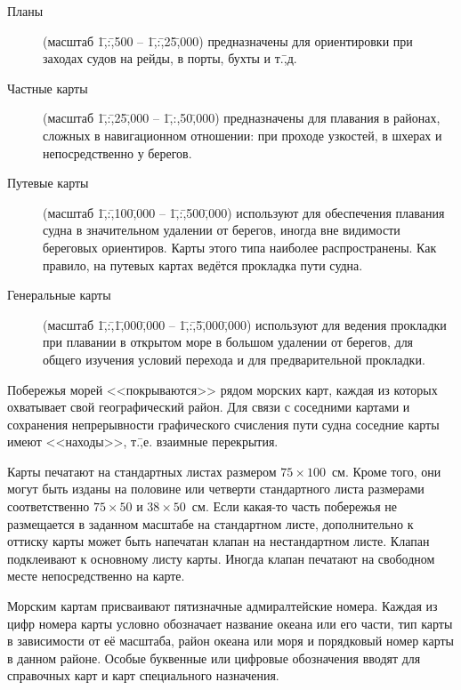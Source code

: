 \begin{description} 
\item [Планы] (масштаб 1\=,:\=,500 \--- 1\=,:\=,25\=,000)
  предназначены для ориентировки при заходах судов на рейды, в порты,
  бухты и т.\=,д.
\item [Частные карты] (масштаб 1\=,:\=,25\=,000
  \--- 1\=,:\-,50\=,000) предназначены для плавания в районах, сложных
  в навигационном отношении: при проходе узкостей, в шхерах и
  непосредственно у берегов.
\item [Путевые карты] (масштаб 1\=,:\=,100\=,000
  \--- 1\=,:\=,500\=,000) используют для обеспечения плавания судна в
  значительном удалении от берегов, иногда вне видимости береговых
  ориентиров. Карты этого типа наиболее распространены. Как правило,
  на путевых картах ведётся прокладка пути судна.
\item [Генеральные карты] (масштаб
  1\=,:\=,1\=,000\=,000 \--- 1\=,:\=,5\=,000\=,000) используют для
  ведения прокладки при плавании в открытом море в большом удалении от
  берегов, для общего изучения условий перехода и для предварительной
  прокладки.
\end{description}

Побережья морей <<покрываются>> рядом морских карт, каждая из которых
охватывает свой географический район. Для связи с соседними картами и
сохранения непрерывности графического счисления пути судна соседние
карты имеют <<находы>>, т.\=,е. взаимные перекрытия.

Карты печатают на стандартных листах размером $75 \times
100$~см. Кроме того, они могут быть изданы на половине или четверти
стандартного листа размерами соответственно $75 \times 50$ и
$38 \times 50$~см. Если какая-то часть побережья не размещается в
заданном масштабе на стандартном листе, дополнительно к оттиску карты
может быть напечатан клапан на нестандартном листе. Клапан подклеивают
к основному листу карты. Иногда клапан печатают на свободном месте
непосредственно на карте.

Морским картам присваивают пятизначные адмиралтейские номера. Каждая
из цифр номера карты условно обозначает название океана или его части,
тип карты в зависимости от её масштаба, район океана или моря и
порядковый номер карты в данном районе. Особые буквенные или цифровые
обозначения вводят для справочных карт и карт специального назначения.

